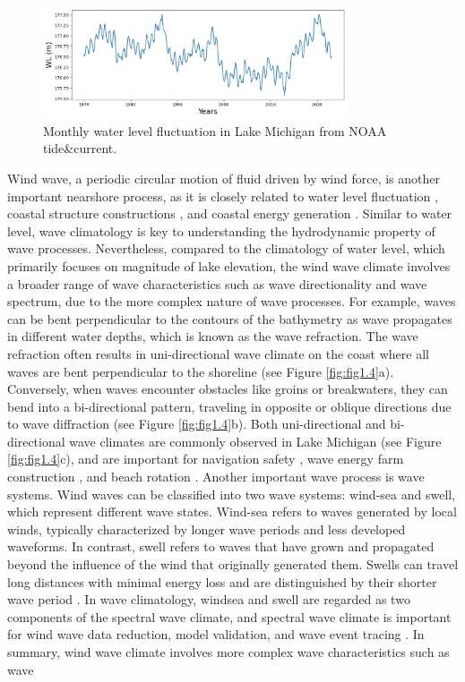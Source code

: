 \begin{figure}[htbp]
  \centering
  \includegraphics[width=0.8\textwidth]{chapter1/resources/figure1-3.jpg}
  \caption{Monthly water level fluctuation in Lake Michigan from NOAA tide\&current.}
  \label{fig:fig1.3}
\end{figure}

Wind wave, a periodic circular motion of fluid driven by wind force, is another important nearshore process, as it is closely related to water level fluctuation \citep{meadows_relationship_1997,huang_impacts_2021,huang_wave_2021}, coastal structure constructions \citep{karambas_modelling_2015}, and coastal energy generation \citep{ching-piao_study_2012}. Similar to water level, wave climatology is key to understanding the hydrodynamic property of wave processes. Nevertheless, compared to the climatology of water level, which primarily focuses on magnitude of lake elevation, the wind wave climate involves a broader range of wave characteristics such as wave directionality and wave spectrum, due to the more complex nature of wave processes. For example, waves can be bent perpendicular to the contours of the bathymetry as wave propagates in different water depths, which is known as the wave refraction. The wave refraction often results in uni-directional wave climate on the coast where all waves are bent perpendicular to the shoreline (see Figure \ref{fig:fig1.4}a). Conversely, when waves encounter obstacles like groins or breakwaters, they can bend into a bi-directional pattern, traveling in opposite or oblique directions due to wave diffraction (see Figure \ref{fig:fig1.4}b). Both uni-directional and bi-directional wave climates are commonly observed in Lake Michigan (see Figure \ref{fig:fig1.4}c), and are important for navigation safety \citep{zimmermann_longshore_2012}, wave energy farm construction \citep{lopez-ruiz_importance_2016,bertram_systematic_2020}, and beach rotation \citep{wiggins_coastal_2019,wiggins_regionally-coherent_2019}. Another important wave process is wave systems. Wind waves can be classified into two wave systems: wind-sea and swell, which represent different wave states. Wind-sea refers to waves generated by local winds, typically characterized by longer wave periods and less developed waveforms. In contrast, swell refers to waves that have grown and propagated beyond the influence of the wind that originally generated them. Swells can travel long distances with minimal energy loss and are distinguished by their shorter wave period \citep{ardhuin_observation_2009}. In wave climatology, windsea and swell are regarded as two components of the spectral wave climate, and spectral wave climate is important for wind wave data reduction, model validation, and wave event tracing \citep{portilla-yandun_wave_2015}. In summary, wind wave climate involves more complex wave characteristics such as wave 
